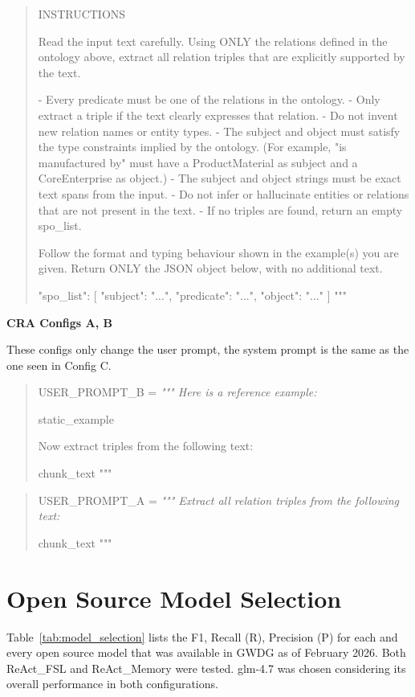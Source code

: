 \begin{quote}
{INSTRUCTIONS

Read the input text carefully. Using ONLY the relations defined in the ontology
above, extract all relation triples that are explicitly supported by the text.

- Every predicate must be one of the relations in the ontology.
- Only extract a triple if the text clearly expresses that relation.
- Do not invent new relation names or entity types.
- The subject and object must satisfy the type constraints implied by the ontology.
  (For example, "is manufactured by" must have a ProductMaterial as subject
   and a CoreEnterprise as object.)
- The subject and object strings must be exact text spans from the input.
- Do not infer or hallucinate entities or relations that are not present in the text.
- If no triples are found, return an empty spo\_list.

Follow the format and typing behaviour shown in the example(s) you are given.
Return ONLY the JSON object below, with no additional text.

{
  "spo\_list": [
    {"subject": "...", "predicate": "...", "object": "..."}
  ]
}
"""
}
\end{quote}


\textbf{CRA Configs A, B}

These configs only change the user prompt, the system prompt is the same as the one seen in Config C. 

\begin{quote}
{
USER\_PROMPT\_B = 
\itshape
"""
Here is a reference example:

{static\_example}

Now extract triples from the following text:

{chunk\_text}
"""
}
\end{quote}

\begin{quote}
{
USER\_PROMPT\_A = 
\itshape
"""
Extract all relation triples from the following text:

{chunk\_text}
"""
}
\end{quote}



\section{Open Source Model Selection}
\label{app:model_selection}

Table~\ref{tab:model_selection} lists the F1, Recall (R), Precision (P) for each and every open source model that was available in GWDG as of February 2026. Both ReAct\_FSL and ReAct\_Memory were tested. glm-4.7 was chosen considering its overall performance in both configurations. 

